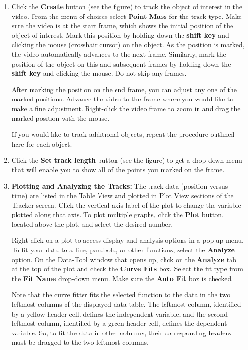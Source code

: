 \begin{enumerate}
\item Click the {\bf Create} button (see the figure) to track the object of interest in the video. 
From the menu of choices select {\bf Point Mass} for the track type. 
Make sure the video is at the start frame, which shows the initial position of the object of interest. 
Mark this position by holding down the {\bf shift key} and clicking the mouse (crosshair cursor) on the object. 
As the position is marked, the video automatically advances to the next frame. 
Similarly, mark the position of the object on this and subsequent frames by holding down the {\bf shift key} 
and clicking the mouse. 
Do not skip any frames. 

After marking the position on the end frame, you can adjust any one of the marked positions. 
Advance the video to the frame where you would like to make a fine adjustment. 
Right-click the video frame to zoom in and drag the marked position with the mouse.

If you would like to track additional objects, repeat the procedure outlined here for each object.

\item Click the {\bf Set track length} button (see the figure) to get a drop-down menu that
will enable you to show all of the points you marked on the frame.

\item {\bf Plotting and Analyzing the Tracks:} The track data (position versus time) are listed in the Table View 
and plotted in Plot View sections of the Tracker screen. 
Click the vertical axis label of the plot to change the variable plotted along that axis. 
To plot multiple graphs, click the {\bf Plot} button, located above the plot, and select the desired number. 

Right-click on a plot to access display and analysis options in a pop-up menu. 
To fit your data to a line, parabola, or other functions, select the {\bf Analyze} option. 
On the Data-Tool window that opens up, click on the {\bf Analyze} tab at the top of the plot and 
check the {\bf Curve Fits} box. Select the fit type from the {\bf Fit Name} drop-down menu.
Make sure the {\bf Auto Fit} box is checked.


Note that the curve fitter fits the selected function to the data in the two leftmost columns of the displayed data table. 
The leftmost column, identified by a yellow header cell, defines the independent variable, and the second leftmost column, 
identified by a green header cell, defines the dependent variable. 
So, to fit the data in other columns, their corresponding headers must be dragged to the two leftmost columns.



\end{enumerate}
